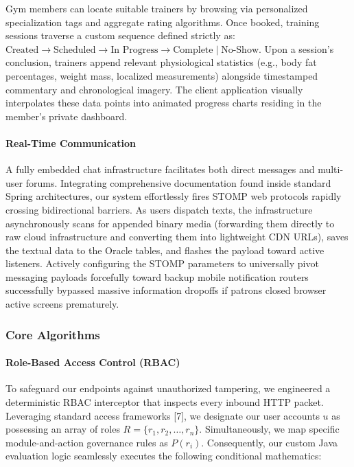 Gym members can locate suitable trainers by browsing via personalized
specialization tags and aggregate rating algorithms. Once booked,
training sessions traverse a custom sequence defined strictly as:
\(\text{Created} \rightarrow \text{Scheduled} \rightarrow \text{In Progress} \rightarrow \text{Complete} \mid \text{No-Show}\).
Upon a session's conclusion, trainers append relevant physiological
statistics (e.g., body fat percentages, weight mass, localized
measurements) alongside timestamped commentary and chronological
imagery. The client application visually interpolates these data points
into animated progress charts residing in the member's private
dashboard.

\paragraph*{Real-Time Communication}\label{real-time-communication}

A fully embedded chat infrastructure facilitates both direct messages
and multi-user forums. Integrating comprehensive documentation found
inside standard Spring architectures, our system effortlessly fires
STOMP web protocols rapidly crossing bidirectional barriers. As users
dispatch texts, the infrastructure asynchronously scans for appended
binary media (forwarding them directly to raw cloud infrastructure and
converting them into lightweight CDN URLs), saves the textual data to
the Oracle tables, and flashes the payload toward active listeners.
Actively configuring the STOMP parameters to universally pivot messaging
payloads forcefully toward backup mobile notification routers
successfully bypassed massive information dropoffs if patrons closed
browser active screens prematurely.

\subsubsection*{Core Algorithms}\label{core-algorithms}

\paragraph*{Role-Based Access Control
(RBAC)}\label{role-based-access-control-rbac}

To safeguard our endpoints against unauthorized tampering, we engineered
a deterministic RBAC interceptor that inspects every inbound HTTP
packet. Leveraging standard access frameworks {[}7{]}, we designate our
user accounts \(u\) as possessing an array of roles
\(R = \{r_1, r_2, \ldots, r_n\}\). Simultaneously, we map specific
module-and-action governance rules as \(P(r_i)\). Consequently, our
custom Java evaluation logic seamlessly executes the following
conditional mathematics:

